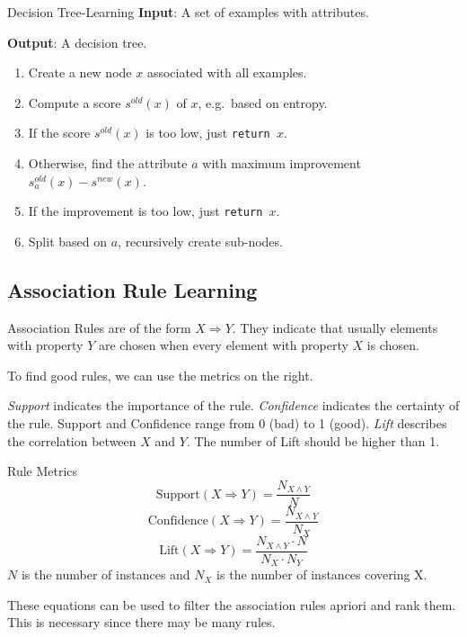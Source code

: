\documentclass[english]{panikzettel}
\begin{document}
\begin{algo}{Decision Tree-Learning}
\textbf{Input}: A set of examples with attributes.

\textbf{Output}: A decision tree.
\tcblower
\begin{enumerate}
    \item Create a new node $x$ associated with all examples.
    \item Compute a score $s^{old}(x)$ of $x$, e.g.\ based on entropy.
    \item If the score $s^{old}(x)$ is too low, just \texttt{return $x$}.
    \item Otherwise, find the attribute $a$ with maximum improvement $s_a^{old}(x) - s^{new}(x)$.
    \item If the improvement is too low, just \texttt{return $x$}.
    \item Split based on $a$, recursively create sub-nodes.
\end{enumerate}
\end{algo}

\subsection{Association Rule Learning}
\label{sec:association-rule}

\begin{halfboxl}
Association Rules are of the form $X \Rightarrow Y$.
They indicate that usually elements with property $Y$ are chosen when every element with property $X$ is chosen.

To find good rules, we can use the metrics on the right.

\emph{Support} indicates the importance of the rule.
\emph{Confidence} indicates the certainty of the rule.
Support and Confidence range from 0 (bad) to 1 (good).
\emph{Lift} describes the correlation between $X$ and $Y$. The number of Lift should be higher than 1.
\end{halfboxl}%
\begin{halfboxr}
\vspace{-\baselineskip}
\begin{defi}{Rule Metrics}
$$\text{Support}(X \Rightarrow Y)= \frac{N_{X \land Y}}{N}$$
$$\text{Confidence}(X \Rightarrow Y)= \frac{N_{X \land Y}}{N_X}$$
$$\text{Lift}(X \Rightarrow Y)= \frac{N_{X \land Y} \cdot N}{N_X \cdot N_Y}$$
$N$ is the number of instances and $N_X$ is the number of instances covering X.
\end{defi}
\end{halfboxr}
These equations can be used to filter the association rules apriori and rank them.
This is necessary since there may be many rules.
\end{document}
